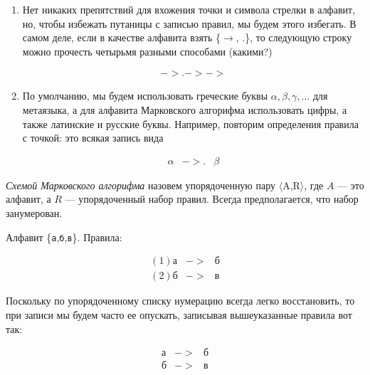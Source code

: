\documentclass[12pt,a4paper,oneside]{article}
\newcommand{\s}[1]{\texttt{#1}}
\begin{document}
\begin{enumerate}
\item Нет никаких препятствий для вхожения точки и символа стрелки
в алфавит, но, чтобы избежать путаницы с записью правил, мы будем этого
избегать. В самом деле, если в качестве алфавита взять \{$\longrightarrow$, .\}, 
то следующую строку можно прочесть четырьмя разными способами (какими?)
\begin{bnf}\begin{eqnarray*}
->.->->
\end{eqnarray*}\end{bnf}

\item По умолчанию, мы будем использовать греческие буквы $\alpha,\beta,\gamma,\dots$ для
метаязыка, а для алфавита Марковского алгорифма использовать цифры, а также латинские и русские буквы.
Например, повторим определения правила с точкой: это всякая запись вида
\begin{bnf}\begin{eqnarray*}\alpha &->.& \beta \end{eqnarray*}\end{bnf}
\end{enumerate}

\begin{definition} \emph{Схемой Марковского алгорифма}
назовем упорядоченную пару $\langle$A,R$\rangle$, где $A$ --- это алфавит, 
а $R$ --- упорядоченный набор правил. Всегда предполагается, что набор 
занумерован.
\end{definition}

\begin{example} Алфавит \{\s{а},\s{б},\s{в}\}. Правила:
\begin{bnf}
  \begin{eqnarray*}
   (1) \s{а}&->&\s{б}\\
   (2) \s{б}&->&\s{в}
\end{eqnarray*}\end{bnf}
\end{example}

Поскольку по упорядоченному списку нумерацию всегда легко 
восстановить, то при записи мы будем часто ее опускать, записывая
вышеуказанные правила вот так:

\begin{bnf}\begin{eqnarray*}
   \s{а}&->&\s{б}\\
   \s{б}&->&\s{в}
\end{eqnarray*}\end{bnf}  
\end{document}
